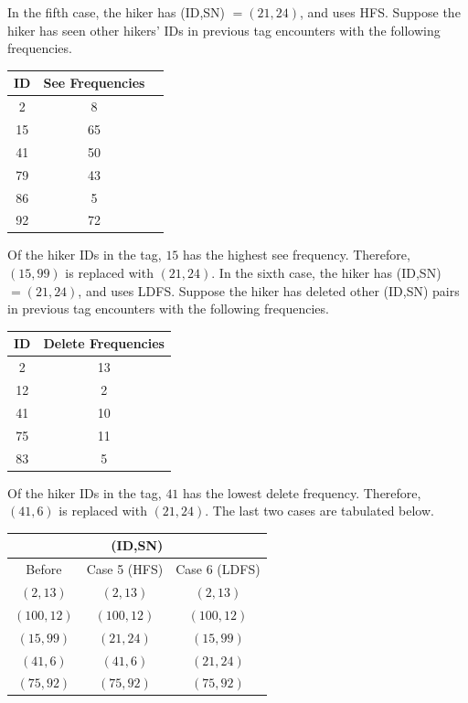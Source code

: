 \documentclass[conference]{IEEEtran}
\begin{document}
In the fifth case, the hiker has (ID,SN) $= (21,24)$, and uses HFS.  Suppose the hiker has seen other hikers' IDs in previous tag encounters with the following frequencies.
\begin{footnotesize}
\begin{center}
\begin{tabular}{|c|c|c|}
\hline
ID & See Frequencies \\
\hline
2 & 8   \\
15 & 65    \\
41 & 50  \\
79 & 43 \\
86 & 5    \\
92 & 72\\
\hline
\end{tabular}
\end{center}
\end{footnotesize}
Of the hiker IDs in the tag, $15$ has the highest see frequency.  Therefore, $(15,99)$ is replaced with $(21,24)$.  In the sixth case, the hiker has (ID,SN) $=(21,24)$, and uses LDFS.  Suppose the hiker has deleted other (ID,SN) pairs in previous tag encounters with the following frequencies.
\begin{footnotesize}
\begin{center}
\begin{tabular}{|c|c|}
\hline
ID & Delete Frequencies \\
\hline
2 & 13    \\
12 & 2   \\
41 & 10    \\
75 & 11    \\
83 & 5     \\
\hline
\end{tabular}
\end{center}
\end{footnotesize}
Of the hiker IDs in the tag, $41$ has the lowest delete frequency.  Therefore, $(41,6)$ is replaced with $(21,24)$.  The last two cases are tabulated below.  
\begin{footnotesize}
\begin{center}
\begin{tabular}{|c|c|c|}
\hline
\multicolumn{3}{|c|}{(ID,SN)} \\
\hline
Before & Case 5 (HFS) & Case 6 (LDFS) \\
\hline
$(2,13)$     & $(2,13)$     & $(2,13)$  \\
$(100,12)$ & $(100,12)$ & $(100,12)$  \\
$(15,99)$   & $(21,24)$   & $(15,99)$ \\
$(41,6)$     & $(41,6)$     & $(21,24)$ \\
$(75,92)$   & $(75,92)$   & $(75,92)$ \\
\hline
\end{tabular}
\end{center}
\end{footnotesize}
\end{document}
